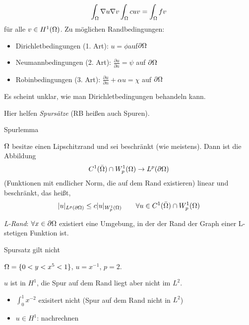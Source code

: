 \begin{align*}
   \int_{\Omega} \nabla u \nabla v \int_\Omega c u v = \int_\Omega fv\\
\end{align*}
für alle $v \in H^1(\Omega)$.
Zu möglichen Randbedingungen: 
\begin{itemize}
\item Dirichletbedingungen (1. Art): $u = \phi $auf$ \partial \Omega$
\item Neumannbedingungen (2. Art): $\frac{\partial u}{\partial n} = \psi$ auf $\partial \Omega$
\item Robinbedingungen (3. Art): $\frac{\partial u}{\partial n} + \alpha u = \chi$ auf $\partial \Omega$
\end{itemize}
Es scheint unklar, wie man Dirichletbedingungen behandeln kann. 

Hier helfen \emph{Spursätze} (RB heißen auch Spuren).
\begin{lemma} Spurlemma

$\Omega$ besitze einen Lipschitzrand und sei beschränkt (wie meistens). Dann ist die Abbildung 
\begin{align*}
  C^1(\bar {\Omega}) \cap W^1_p(\Omega) \to L^p(\partial \Omega)
\end{align*}
 (Funktionen mit endlicher Norm, die auf dem Rand existieren) linear und beschränkt, das heißt,
 \begin{align} \label{eq:spur}
   |u| _{L^p(\partial \Omega)} \leq c |u|_{W_p^1(\Omega)} \qquad \forall u \in C^1(\bar {\Omega}) \cap W^1_p (\Omega)
 \end{align}

\end{lemma}

\emph{L-Rand}: $\forall x \in \partial \Omega$ existiert eine Umgebung, in der der Rand der Graph einer L-stetigen Funktion ist. 

\begin{beispiel} Spursatz gilt nicht

$\Omega = \{0 < y < x^5 < 1\}$, $u = x^{-1}$, $p = 2$.

$u$ ist in $H^1$, die Spur auf dem Rand liegt aber nicht im $L^2$.
\begin{itemize}
\item $\int_0^1 x^{-2}$ exisitert nicht (Spur auf dem Rand nicht in $L^2$)
\item $u \in H^1$: nachrechnen
\end{itemize}
\end{beispiel}

